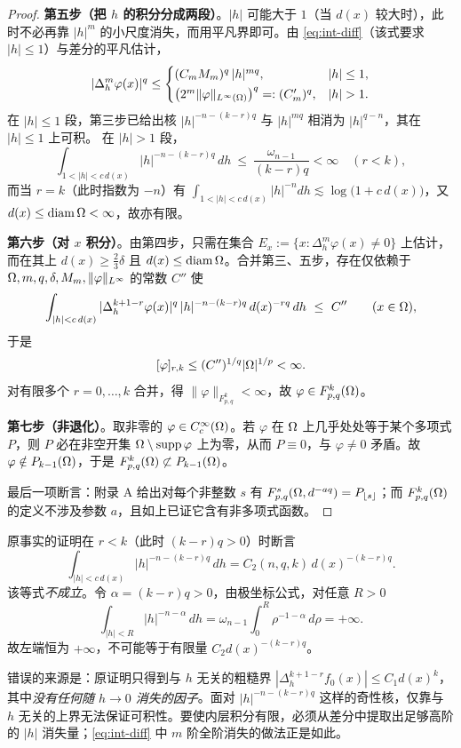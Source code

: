 \begin{proof}
\textbf{第五步（把 $h$ 的积分分成两段）}。$|h|$ 可能大于 $1$（当 $d(x)$ 较大时），此时不必再靠 $|h|^m$ 的小尺度消失，而用平凡界即可。由 \eqref{eq:int-diff}（该式要求 $|h|\le1$）与差分的平凡估计，
\[
  |\Delta_h^m\varphi(x)|^q\le
  \begin{cases}
    (C_mM_m)^q\,|h|^{mq}, & |h|\le1,\\[2pt]
    \big(2^m\|\varphi\|_{L^\infty(\Om)}\big)^q=:(C_m')^q, & |h|>1 .
  \end{cases}
\]
在 $|h|\le1$ 段，第三步已给出核 $|h|^{-n-(k-r)q}$ 与 $|h|^{mq}$ 相消为 $|h|^{q-n}$，其在 $|h|\le1$ 上可积。
在 $|h|>1$ 段，
\[
  \int_{1<|h|<c\,d(x)}|h|^{-n-(k-r)q}\,dh\ \le\ \frac{\omega_{n-1}}{(k-r)q}<\infty\quad(r<k),
\]
而当 $r=k$（此时指数为 $-n$）有 $\int_{1<|h|<c\,d(x)}|h|^{-n}dh\lesssim\log\big(1+c\,d(x)\big)$，又 $d(x)\le\operatorname{diam}\Omega<\infty$，故亦有限。

\textbf{第六步（对 $x$ 积分）}。由第四步，只需在集合 $E_x:=\{x:\Delta_h^m\varphi(x)\ne0\}$ 上估计，而在其上 $d(x)\ge\tfrac23\delta$ 且 $d(x)\le\operatorname{diam}\Omega$。合并第三、五步，存在仅依赖于 $\Omega,m,q,\delta,M_m,\|\varphi\|_{L^\infty}$ 的常数 $C''$ 使
\[
  \int_{|h|<c\,d(x)}|\Delta_h^{k+1-r}\varphi(x)|^q\,|h|^{-n-(k-r)q}\,d(x)^{-rq}\,dh\ \le\ C''
\qquad(x\in\Om),
\]
于是
\[
  [\varphi]_{r,k}\le (C'')^{1/q}|\Omega|^{1/p}<\infty .
\]
对有限多个 $r=0,\dots,k$ 合并，得 $\|\varphi\|_{F^k_{p,q}}<\infty$，故 $\varphi\in F^k_{p,q}(\Omega)$。

\textbf{第七步（非退化）}。取非零的 $\varphi\in C_c^\infty(\Omega)$。若 $\varphi$ 在 $\Omega$ 上几乎处处等于某个多项式 $P$，则 $P$ 必在非空开集 $\Omega\setminus\operatorname{supp}\varphi$ 上为零，从而 $P\equiv0$，与 $\varphi\ne0$ 矛盾。故 $\varphi\notin P_{k-1}(\Omega)$，于是 $F^k_{p,q}(\Omega)\not\subset P_{k-1}(\Omega)$。

最后一项断言：附录 A 给出对每个非整数 $s$ 有 $F^{s}_{p,q}(\Omega,d^{-aq})=P_{\lfloor s\rfloor}$；而 $F^k_{p,q}(\Omega)$ 的定义不涉及参数 $a$，且如上已证它含有非多项式函数。
\end{proof}

\begin{remark}\label{rem:int-why-fail}
原事实的证明在 $r<k$（此时 $(k-r)q>0$）时断言
\[
  \int_{|h|<c\,d(x)}|h|^{-n-(k-r)q}\,dh=C_2(n,q,k)\,d(x)^{-(k-r)q}.
\]
该等式\emph{不成立}。令 $\alpha=(k-r)q>0$，由极坐标公式，对任意 $R>0$
\[
  \int_{|h|<R}|h|^{-n-\alpha}\,dh
  =\omega_{n-1}\int_0^R\rho^{-1-\alpha}\,d\rho=+\infty .
\]
故左端恒为 $+\infty$，不可能等于有限量 $C_2d(x)^{-(k-r)q}$。

错误的来源是：原证明只得到与 $h$ 无关的粗糙界 $|\Delta_h^{k+1-r}f_0(x)|\le C_1d(x)^k$，其中\emph{没有任何随 $h\to0$ 消失的因子}。面对 $|h|^{-n-(k-r)q}$ 这样的奇性核，仅靠与 $h$ 无关的上界无法保证可积性。要使内层积分有限，必须从差分中提取出足够高阶的 $|h|$ 消失量；\eqref{eq:int-diff} 中 $m$ 阶全阶消失的做法正是如此。
\end{remark}

